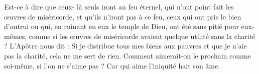 Est-ce à dire que ceux- là seuls iront au feu éternel, qui n’ont point fait les œuvres de miséricorde, et qu’ils n’iront pas à ce feu, ceux qui ont pris le bien d’autrui ou qui, en ruinant en eux le temple de Dieu, ont été sans pitié pour eux-mêmes, comme si les œuvres de miséricorde avaient quelque utilité sans la charité ? L’Apôtre nous dit : Si je distribue tous mes biens aux pauvres et que je n’aie pas la charité, cela ne me sert de rien. Comment aimerait-on le prochain comme soi-même, si l’on ne s’aime pas ? Car qui aime l'iniquité hait son âme.
